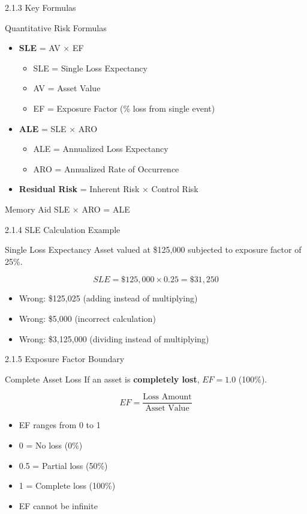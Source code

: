 \documentclass{beamer}
\begin{document}
	\begin{frame}{2.1.3 Key Formulas}
		\begin{block}{Quantitative Risk Formulas}
			\begin{itemize}
				\item \textbf{SLE} = AV × EF
				\begin{itemize}
					\item SLE = Single Loss Expectancy
					\item AV = Asset Value
					\item EF = Exposure Factor (\% loss from single event)
				\end{itemize}
				\item \textbf{ALE} = SLE × ARO
				\begin{itemize}
					\item ALE = Annualized Loss Expectancy
					\item ARO = Annualized Rate of Occurrence
				\end{itemize}
				\item \textbf{Residual Risk} = Inherent Risk × Control Risk
			\end{itemize}
		\end{block}
		\begin{alertblock}{Memory Aid}
			SLE × ARO = ALE
		\end{alertblock}
	\end{frame}
	
	\begin{frame}{2.1.4 SLE Calculation Example}
		\begin{block}{Single Loss Expectancy}
			Asset valued at \$125,000 subjected to exposure factor of 25\%.
		\end{block}
		\[ SLE = \$125{,}000 \times 0.25 = \$31{,}250 \]
		\begin{itemize}
			\item Wrong: \$125,025 (adding instead of multiplying)
			\item Wrong: \$5,000 (incorrect calculation)
			\item Wrong: \$3,125,000 (dividing instead of multiplying)
		\end{itemize}
	\end{frame}
	
	\begin{frame}{2.1.5 Exposure Factor Boundary}
		\begin{block}{Complete Asset Loss}
			If an asset is \textbf{completely lost}, $EF = 1.0$ (100\%).
		\end{block}
		\[ EF = \frac{\text{Loss Amount}}{\text{Asset Value}} \]
		\begin{itemize}
			\item EF ranges from 0 to 1
			\item 0 = No loss (0\%)
			\item 0.5 = Partial loss (50\%)
			\item 1 = Complete loss (100\%)
			\item EF cannot be infinite
		\end{itemize}
	\end{frame}
	
\end{document}
